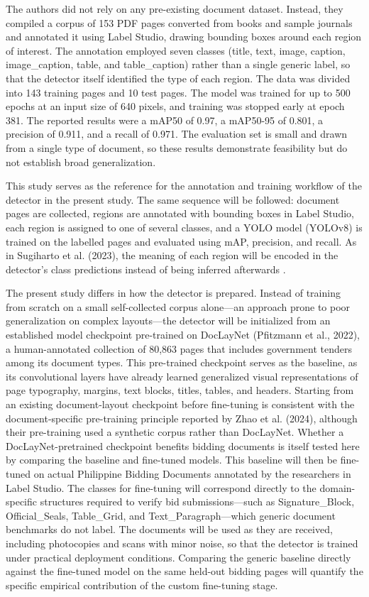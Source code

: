 The authors did not rely on any pre-existing document dataset.
Instead, they compiled a corpus of 153 PDF pages converted from books and sample journals and annotated it using Label Studio, drawing bounding boxes around each region of interest.
The annotation employed seven classes (title, text, image, caption, image\_caption, table, and table\_caption) rather than a single generic label, so that the detector itself identified the type of each region.
The data was divided into 143 training pages and 10 test pages.
The model was trained for up to 500 epochs at an input size of 640 pixels, and training was stopped early at epoch 381.
The reported results were a mAP50 of 0.97, a mAP50-95 of 0.801, a precision of 0.911, and a recall of 0.971.
The evaluation set is small and drawn from a single type of document, so these results demonstrate feasibility but do not establish broad generalization.

This study serves as the reference for the annotation and training workflow of the detector in the present study.
The same sequence will be followed: document pages are collected, regions are annotated with bounding boxes in Label Studio, each region is assigned to one of several classes, and a YOLO model (YOLOv8) is trained on the labelled pages and evaluated using mAP, precision, and recall.
As in Sugiharto et al. (2023), the meaning of each region will be encoded in the detector's class predictions instead of being inferred afterwards \cite{ref51}.

The present study differs in how the detector is prepared.
Instead of training from scratch on a small self-collected corpus alone---an approach prone to poor generalization on complex layouts---the detector will be initialized from an established model checkpoint pre-trained on DocLayNet (Pfitzmann et al., 2022), a human-annotated collection of 80,863 pages that includes government tenders among its document types.
This pre-trained checkpoint serves as the baseline, as its convolutional layers have already learned generalized visual representations of page typography, margins, text blocks, titles, tables, and headers.
Starting from an existing document-layout checkpoint before fine-tuning is consistent with the document-specific pre-training principle reported by Zhao et al. (2024), although their pre-training used a synthetic corpus rather than DocLayNet.
Whether a DocLayNet-pretrained checkpoint benefits bidding documents is itself tested here by comparing the baseline and fine-tuned models.
This baseline will then be fine-tuned on actual Philippine Bidding Documents annotated by the researchers in Label Studio.
The classes for fine-tuning will correspond directly to the domain-specific structures required to verify bid submissions---such as Signature\_Block, Official\_Seals, Table\_Grid, and Text\_Paragraph---which generic document benchmarks do not label.
The documents will be used as they are received, including photocopies and scans with minor noise, so that the detector is trained under practical deployment conditions.
Comparing the generic baseline directly against the fine-tuned model on the same held-out bidding pages will quantify the specific empirical contribution of the custom fine-tuning stage.

